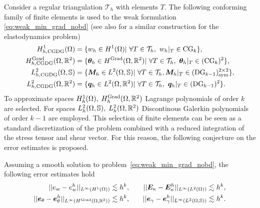 Consider a regular triangulation $\mathcal{T}_h$ with elements $T$. The following conforming family of finite elements is used to the weak formulation \eqref{eq:weak_min_grad_nobd} (see also \cite{cohen2005} for a similar construction for the elastodynamics problem)
\begin{equation}\label{eq:CGDG}
\begin{aligned}
H_{h, \text{CGDG}}^{1}(\Omega) &= \{w_h \in H^1(\Omega) \vert \ \forall T \in \mathcal{T}_h, \ w_h|_{T} \in \mathrm{CG}_{k} \}, \\
H_{h, \text{CGDG}}^{\Grad}(\Omega, \bbR^2) &= \{ \bm{\theta}_h \in H^{\Grad}(\Omega, \bbR^2) \vert \ \forall T \in \mathcal{T}_h,\ \bm{\theta}_h|_{T} \in (\mathrm{CG}_{k})^2 \}, \\
L_{h, \text{CGDG}}^2(\Omega, \mathbb{S}) &= \{ \bm{M}_h \in L^2(\Omega, \mathbb{S}) \vert \ \forall T \in \mathcal{T}_h, \bm{M}_h|_{T} \in (\mathrm{DG}_{k-1})^{2 \times 2}_{\text{sym}} \}, \\
L_{h, \text{CGDG}}^2(\Omega, \bbR^2) &= \{\bm{q}_h \in L^2(\Omega, \bbR^2)  \vert \ \forall T \in \mathcal{T}_h,\ \bm{q}_h|_{T} \in (\mathrm{DG}_{k-1})^{2} \}. \\
\end{aligned}
\end{equation}
To approximate spaces $H_h^{1}(\Omega), \; H_h^{\operatorname*{Grad}}(\Omega, \mathbb{R}^2)$ Lagrange polynomials of order $k$ are selected. For spaces $L_h^2(\Omega, \mathbb{S}), \; L_h^2(\Omega, \mathbb{R}^2)$ Discontinous Galerkin polynomials of order $k-1$ are employed. This selection of finite elements can be seen as a standard discretization of the problem combined with a reduced integration of the stress tensor and shear vector. For this reason, the following conjecture on the error estimates is proposed. 

\begin{conjecture}
	\label{conj:CGDGestimates}
	Assuming a smooth solution to problem~\eqref{eq:weak_min_grad_nobd}, the following error estimates hold 
	\begin{equation}
	\label{eq:errCGDG}
	\begin{aligned}
	||e_w - e_w^h||_{L^{\infty}(H^1(\Omega))} &\lesssim h^{k}, \\
	||\bm{e}_\theta - \bm{e}_\theta^h||_{L^{\infty}(H^{\operatorname*{Grad}}(\Omega, \mathbb{R}^2))} &\lesssim h^{k}, \\
	\end{aligned} \qquad
	\begin{aligned}
	||\bm{E}_\kappa - \bm{E}_\kappa^h||_{L^{\infty}(L^2(\Omega))} &\lesssim  h^{k}, \\
	||\bm{e}_\gamma - \bm{e}_\gamma^ h||_{L^{\infty}(L^2(\Omega, \mathbb{S}))} &\lesssim  h^{k}. \\
	\end{aligned} 
	\end{equation}
	
\end{conjecture}


